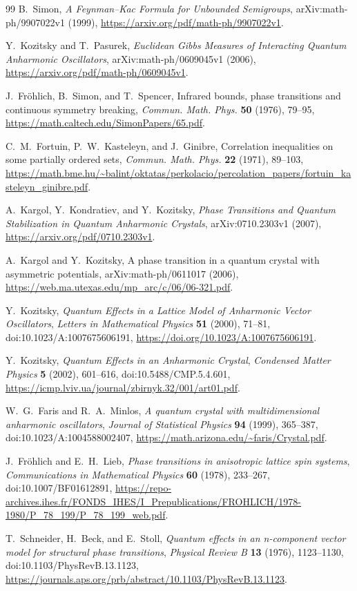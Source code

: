 \documentclass[11pt]{article}
\numberwithin{equation}{section}
\theoremstyle{definition}
\begin{document}
\begin{thebibliography}{99}
B.~Simon,
\emph{A Feynman--Kac Formula for Unbounded Semigroups},
arXiv:math-ph/9907022v1 (1999),
\url{https://arxiv.org/pdf/math-ph/9907022v1}.

Y.~Kozitsky and T.~Pasurek,
\emph{Euclidean Gibbs Measures of Interacting Quantum Anharmonic Oscillators},
arXiv:math-ph/0609045v1 (2006),
\url{https://arxiv.org/pdf/math-ph/0609045v1}.

J.~Fr\"ohlich, B.~Simon, and T.~Spencer,
Infrared bounds, phase transitions and continuous symmetry breaking,
\emph{Commun. Math. Phys.} \textbf{50} (1976), 79--95,
\url{https://math.caltech.edu/SimonPapers/65.pdf}.

C.~M.~Fortuin, P.~W.~Kasteleyn, and J.~Ginibre,
Correlation inequalities on some partially ordered sets,
\emph{Commun. Math. Phys.} \textbf{22} (1971), 89--103,
\url{https://math.bme.hu/~balint/oktatas/perkolacio/percolation_papers/fortuin_kasteleyn_ginibre.pdf}.

A.~Kargol, Y.~Kondratiev, and Y.~Kozitsky,
\emph{Phase Transitions and Quantum Stabilization in Quantum Anharmonic Crystals},
arXiv:0710.2303v1 (2007),
\url{https://arxiv.org/pdf/0710.2303v1}.

A.~Kargol and Y.~Kozitsky,
A phase transition in a quantum crystal with asymmetric potentials,
arXiv:math-ph/0611017 (2006),
\url{https://web.ma.utexas.edu/mp_arc/c/06/06-321.pdf}.

Y.~Kozitsky,
\emph{Quantum Effects in a Lattice Model of Anharmonic Vector Oscillators},
\emph{Letters in Mathematical Physics} \textbf{51} (2000), 71--81,
doi:10.1023/A:1007675606191,
\url{https://doi.org/10.1023/A:1007675606191}.

Y.~Kozitsky,
\emph{Quantum Effects in an Anharmonic Crystal},
\emph{Condensed Matter Physics} \textbf{5} (2002), 601--616,
doi:10.5488/CMP.5.4.601,
\url{https://icmp.lviv.ua/journal/zbirnyk.32/001/art01.pdf}.

W.~G.~Faris and R.~A.~Minlos,
\emph{A quantum crystal with multidimensional anharmonic oscillators},
\emph{Journal of Statistical Physics} \textbf{94} (1999), 365--387,
doi:10.1023/A:1004588002407,
\url{https://math.arizona.edu/~faris/Crystal.pdf}.

J.~Fr\"ohlich and E.~H.~Lieb,
\emph{Phase transitions in anisotropic lattice spin systems},
\emph{Communications in Mathematical Physics} \textbf{60} (1978), 233--267,
doi:10.1007/BF01612891,
\url{https://repo-archives.ihes.fr/FONDS_IHES/I_Prepublications/FROHLICH/1978-1980/P_78_199/P_78_199_web.pdf}.

T.~Schneider, H.~Beck, and E.~Stoll,
\emph{Quantum effects in an n-component vector model for structural phase transitions},
\emph{Physical Review B} \textbf{13} (1976), 1123--1130,
doi:10.1103/PhysRevB.13.1123,
\url{https://journals.aps.org/prb/abstract/10.1103/PhysRevB.13.1123}.

\end{thebibliography}
\end{document}
